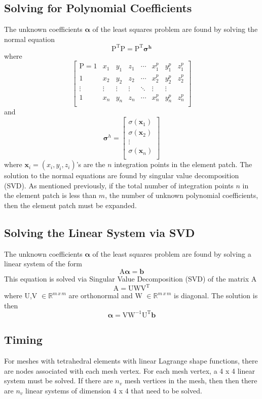 \documentclass{article}
\begin{document}
\subsection{Solving for Polynomial Coefficients}
\label{ss:solve}
The unknown coefficients $\boldsymbol{\alpha}$ of the least squares problem
are found by solving the normal equation
\[
\mathrm{P^TP} = \mathrm{P^T} \boldsymbol{\sigma^h} 
\]
where
\[
\begin{bmatrix}
\mathrm{P} = 
1 & x_1 & y_1 & z_1 & \cdots & x_1^p & y_1^p & z_1^p \\
1 & x_2 & y_2 & z_2 & \cdots & x_2^p & y_2^p & z_2^p \\
\vdots & \vdots & \vdots & \vdots & \ddots & \vdots & \vdots \\
1 & x_n & y_n & z_n & \cdots & x_n^p & y_n^p & z_n^p \\
\end{bmatrix}
\]
and
\[
\boldsymbol{\sigma}^h	=
\begin{bmatrix}
\sigma(\textbf{x}_1) \\
\sigma(\textbf{x}_2) \\
\vdots \\
\sigma(\textbf{x}_n) \\
\end{bmatrix}
\]
where $\textbf{x}_i = (x_i,y_i,z_i)$'s are the $n$ integration points in 
the element patch. The solution to the normal equations are found by 
singular value decomposition (SVD). As mentioned previously, if the total 
number of integration points $n$ in the element patch is less than $m$, 
the number of unknown polynomial coefficients, then the element patch must 
be expanded.

\subsection{Solving the Linear System via SVD}
The unknown coefficients $\boldsymbol{\alpha}$ of the least squares 
problem are found by solving a linear system of the form
\[
\mathrm{A} \boldsymbol{\alpha} = \textbf{b}
\]
This equation is solved via Singular Value Decomposition (SVD) of the 
matrix $\mathrm{A}$
\[
\mathrm{A} = \mathrm{U} \mathrm{W} \mathrm{V^T}
\]
where U,V $\in \mathbb{R}^{m \, x \, m}$ are orthonormal and 
W $\in \mathbb{R}^{m \, x \, m}$ is diagonal.
The solution is then
\[
\boldsymbol{\alpha} = \mathrm{V} 
\mathrm{W}^{-1} \mathrm{U^T} \textbf{b}
\]

\subsection{Timing}
For meshes with tetrahedral elements with linear Lagrange shape functions, 
there are nodes associated with each mesh vertex. For each mesh vertex, a 
4 x 4 linear system must be solved. If there are $n_v$ mesh vertices in the
mesh, then then there are $n_v$ linear systems of dimension 4 x 4 that need
to be solved.
\end{document}
